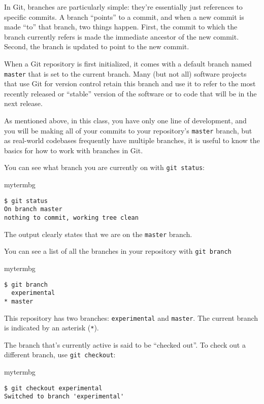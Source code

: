 In Git, branches are particularly simple:  they're essentially just references
to specific commits.  A branch ``points'' to a commit, and when a new commit is
made ``to'' that branch, two things happen.  First, the commit to which the
branch currently refers is made the immediate ancestor of the new commit.
Second, the branch is updated to point to the new commit.

When a Git repository is first initialized, it comes with a default branch
named \texttt{master} that is set to the current branch.  Many (but not all)
software projects that use Git for version control retain this branch and use
it to refer to the most recently released or ``stable'' version of the software
or to code that will be in the next release.

As mentioned above, in this class, you have only one line of development, and
you will be making all of your commits to your repository's \texttt{master}
branch, but as real-world codebases frequently have multiple branches, it is
useful to know the basics for how to work with branches in Git.

You can see what branch you are currently on with \texttt{git status}:

\begin{tsession}{mytermbg}
\begin{verbatim}
$ git status
On branch master
nothing to commit, working tree clean
\end{verbatim}
\end{tsession}

The output clearly states that we are on the \texttt{master} branch.

You can see a list of all the branches in your repository with \texttt{git
branch}

\begin{tsession}{mytermbg}
\begin{verbatim}
$ git branch
  experimental
* master
\end{verbatim}
\end{tsession}

This repository has two branches:  \texttt{experimental} and \texttt{master}.
The current branch is indicated by an asterisk (\texttt{*}).

The branch that's currently active is said to be ``checked out''.  To check out
a different branch, use \texttt{git checkout}:

\begin{tsession}{mytermbg}
\begin{verbatim}
$ git checkout experimental
Switched to branch 'experimental'
\end{verbatim}
\end{tsession}

